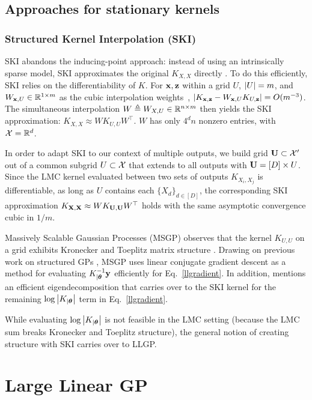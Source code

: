 \documentclass{article}
\begin{document}
\subsection{Approaches for stationary kernels}

\subsubsection{Structured Kernel Interpolation (SKI)}\label{ski-section}

SKI abandons the inducing-point approach: instead of using an intrinsically sparse model, SKI approximates the original $K_{X,X}$ directly \cite{kiss-gp}. To do this efficiently, SKI relies on the differentiability of $K$. For $\textbf{x},\textbf{z}$ within a grid $U$, $\left\vert{U}\right\vert=m$, and $W_{\textbf{x},U}\in\mathbb{R}^{1\times m}$ as the cubic interpolation weights~\cite{keys1981cubic}, $\left|K_{\textbf{x},\textbf{z}}-W_{\textbf{x},U}K_{U,\textbf{z}}\right|=O(m^{-3})$. The simultaneous interpolation $W\triangleq W_{X,U}\in\mathbb{R}^{n\times m}$ then yields the SKI approximation: $K_{X,X}\approx WK_{U,U}W^\top$. $W$ has only $4^dn$ nonzero entries, with $\mathcal{X}=\mathbb{R}^d$.

In order to adapt SKI to our context of multiple outputs, we build grid $\textbf{U}\subset\mathcal{X}'$ out of a common subgrid $U\subset\mathcal{X}$ that extends to all outputs with $\textbf{U} = [D]\times U$. Since the LMC kernel evaluated between two sets of outputs $K_{X_i,X_j}$ is differentiable, as long as $U$ contains each $\{X_d\}_{d\in[D]}$, the corresponding SKI approximation $K_{\textbf{X},\textbf{X}}\approx WK_{\textbf{U},\textbf{U}}W^\top$ holds with the same asymptotic convergence cubic in $1/m$.

Massively Scalable Gaussian Processes (MSGP) observes that the kernel $K_{U,U}$ on a grid exhibits Kronecker and Toeplitz matrix structure \cite{msgp}. Drawing on previous work on structured GPs \cite{cunningham2008fast, gilboa2015scaling}, MSGP uses linear conjugate gradient descent as a method for evaluating $K_{|{\boldsymbol\theta}}^{-1}\textbf{y}$ efficiently for Eq.~\ref{llgradient}. In addition, \cite{wilson2014fast} mentions an efficient eigendecomposition that carries over to the SKI kernel for the remaining $\log\left|K_{|{\boldsymbol\theta}}\right|$ term in Eq.~\ref{llgradient}.

While evaluating $\log\left|K_{|{\boldsymbol\theta}}\right|$ is not feasible in the LMC setting (because the LMC sum breaks Kronecker and Toeplitz structure), the general notion of creating structure with SKI carries over to LLGP.

\section{Large Linear GP} \label{sec:matrix-free}
\end{document}
